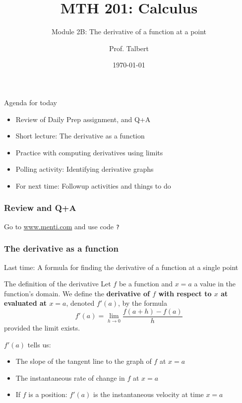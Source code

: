 \documentclass{beamer}
\title{MTH 201: Calculus}
\subtitle{Module 2B: The derivative of a function at a point}
\author{Prof. Talbert}
\institute{GVSU}
\date{\today}
\begin{document}
\frame{\titlepage}

\begin{frame}{Agenda for today}
    \begin{itemize}
        \item<1-> Review of Daily Prep assignment, and Q+A
        \item<2-> Short lecture: The derivative as a function 
        \item<3-> Practice with computing derivatives using limits 
        \item<4-> Polling activity: Identifying derivative graphs 
        \item<5-> For next time: Followup activities and things to do 
    \end{itemize}
\end{frame}

\begin{frame}
    \frametitle{Review and Q+A}

    \begin{center}
        Go to \url{www.menti.com} and use code \texttt{?}
    \end{center}

\end{frame}

\begin{frame}
    \frametitle{The derivative as a function}

    Last time: A formula for finding the derivative of a function at a single point

    \begin{alertblock}{The definition of the derivative}
        Let $f$ be a function and $x=a$ a value in the function's domain. We define the \textbf{derivative of $f$ with respect to $x$ at evaluated at $x=a$}, denoted $f'(a)$, by the formula
        $$f'(a) = \lim_{h \to 0} \frac{f(a+h) - f(a)}{h}$$
        provided the limit exists. 
    \end{alertblock}

    $f'(a)$ tells us: 
    \begin{itemize}
        \item The slope of the tangent line to the graph of $f$ at $x=a$
        \item The instantaneous rate of change in $f$ at $x=a$
        \item If $f$ is a position: $f'(a)$ is the instantaneous velocity at time $x=a$
    \end{itemize}

\end{frame}
\end{document}
